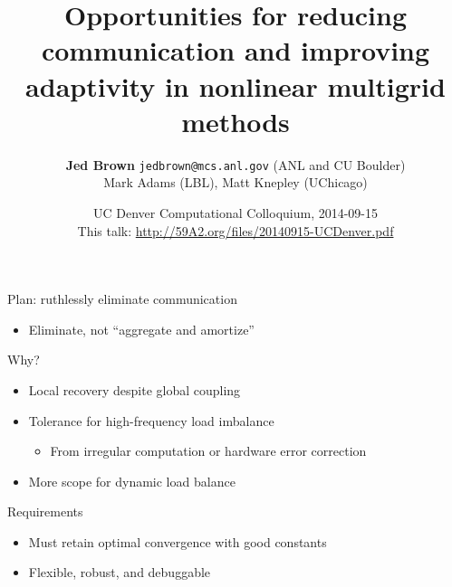 \documentclass{beamer}
\title{Opportunities for reducing communication and improving adaptivity in nonlinear multigrid methods}
\author{{\bf Jed Brown} \texttt{jedbrown@mcs.anl.gov} (ANL and CU Boulder) \\
  \quad Mark Adams (LBL), Matt Knepley (UChicago)
}
\date{UC Denver Computational Colloquium, 2014-09-15 \\[1em]
This talk: \url{http://59A2.org/files/20140915-UCDenver.pdf}}
\begin{document}
\lstset{language=C}
\normalem

\begin{frame}
  \titlepage
\end{frame}

\begin{frame}{Plan: ruthlessly eliminate communication}
  \begin{itemize}
  \item Eliminate, not ``aggregate and amortize''
  \end{itemize}
  \begin{block}{Why?}
    \begin{itemize}
    \item Local recovery despite global coupling
    \item Tolerance for high-frequency load imbalance
      \begin{itemize}
      \item From irregular computation or hardware error correction
      \end{itemize}
    \item More scope for dynamic load balance
    \end{itemize}
  \end{block}
  \begin{block}{Requirements}
    \begin{itemize}
    \item Must retain optimal convergence with good constants
    \item Flexible, robust, and debuggable
    \end{itemize}
  \end{block}
\end{frame}
\end{document}
